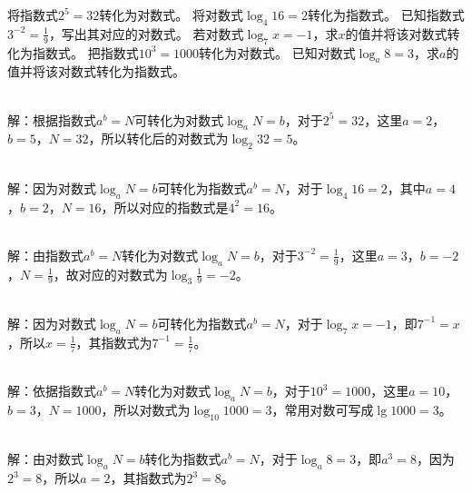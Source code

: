 \begin{Exercise}[title={对数式与指数式转化练习}, label={ex:logarithm},difficulty=1]
    \Question 将指数式\(2^5 = 32\)转化为对数式。
    \Question 将对数式\(\log_{4}16 = 2\)转化为指数式。
    \Question 已知指数式\(3^{-2}=\frac{1}{9}\)，写出其对应的对数式。
    \Question 若对数式\(\log_{7}x = - 1\)，求\(x\)的值并将该对数式转化为指数式。
    \Question 把指数式\(10^3 = 1000\)转化为对数式。
    \Question 已知对数式\(\log_{a}8 = 3\)，求\(a\)的值并将该对数式转化为指数式。
\end{Exercise}
\begin{MyAnswer}[ref={ex:logarithm}]
        \Question {}\\解：根据指数式\(a^b = N\)可转化为对数式\(\log_{a}N = b\)，对于\(2^5 = 32\)，这里\(a = 2\)，\(b = 5\)，\(N = 32\)，所以转化后的对数式为\(\log_{2}32 = 5\)。

        \Question {}\\解：因为对数式\(\log_{a}N = b\)可转化为指数式\(a^b = N\)，对于\(\log_{4}16 = 2\)，其中\(a = 4\)，\(b = 2\)，\(N = 16\)，所以对应的指数式是\(4^2 = 16\)。

        \Question {}\\解：由指数式\(a^b = N\)转化为对数式\(\log_{a}N = b\)，对于\(3^{-2}=\frac{1}{9}\)，这里\(a = 3\)，\(b=-2\)，\(N=\frac{1}{9}\)，故对应的对数式为\(\log_{3}\frac{1}{9}=-2\)。

        \Question {}\\解：因为对数式\(\log_{a}N = b\)可转化为指数式\(a^b = N\)，对于\(\log_{7}x = - 1\)，即\(7^{-1}=x\)，所以\(x=\frac{1}{7}\)，其指数式为\(7^{-1}=\frac{1}{7}\)。

        \Question {}\\解：依据指数式\(a^b = N\)转化为对数式\(\log_{a}N = b\)，对于\(10^3 = 1000\)，这里\(a = 10\)，\(b = 3\)，\(N = 1000\)，所以对数式为\(\log_{10}1000 = 3\)，常用对数可写成\(\lg1000 = 3\)。

        \Question {}\\解：由对数式\(\log_{a}N = b\)转化为指数式\(a^b = N\)，对于\(\log_{a}8 = 3\)，即\(a^3 = 8\)，因为\(2^3 = 8\)，所以\(a = 2\)，其指数式为\(2^3 = 8\)。
\end{MyAnswer}


